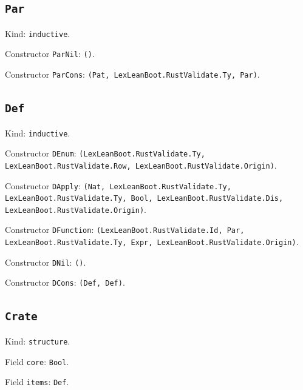 \documentclass[11pt]{article}
\begin{document}
\subsection*{\texttt{Par}}
\noindent Kind: \texttt{inductive}.\par
\noindent Constructor \texttt{ParNil}: \texttt{()}.\par
\noindent Constructor \texttt{ParCons}: \texttt{(Pat, LexLeanBoot.RustValidate.Ty, Par)}.\par
\subsection*{\texttt{Def}}
\noindent Kind: \texttt{inductive}.\par
\noindent Constructor \texttt{DEnum}: \texttt{(LexLeanBoot.RustValidate.Ty, LexLeanBoot.RustValidate.Row, LexLeanBoot.RustValidate.Origin)}.\par
\noindent Constructor \texttt{DApply}: \texttt{(Nat, LexLeanBoot.RustValidate.Ty, LexLeanBoot.RustValidate.Ty, Bool, LexLeanBoot.RustValidate.Dis, LexLeanBoot.RustValidate.Origin)}.\par
\noindent Constructor \texttt{DFunction}: \texttt{(LexLeanBoot.RustValidate.Id, Par, LexLeanBoot.RustValidate.Ty, Expr, LexLeanBoot.RustValidate.Origin)}.\par
\noindent Constructor \texttt{DNil}: \texttt{()}.\par
\noindent Constructor \texttt{DCons}: \texttt{(Def, Def)}.\par
\subsection*{\texttt{Crate}}
\noindent Kind: \texttt{structure}.\par
\noindent Field \texttt{core}: \texttt{Bool}.\par
\noindent Field \texttt{items}: \texttt{Def}.\par
\end{document}
